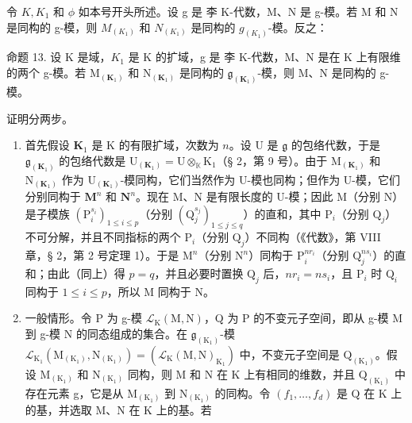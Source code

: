 令 \(K, K_{1}\) 和 \(\phi\) 如本号开头所述。设 g 是 李 K-代数，M、N 是 g-模。若 M 和 N 是同构的 g-模，则 \(M_{(K_{1})}\) 和 \(N_{(K_{1})}\) 是同构的 \(g_{(K_{1})}\)-模。反之：

命题 13. 设 K 是域，\(K_{1}\) 是 K 的扩域，g 是 李 K-代数，M、N 是在 K 上有限维的两个 g-模。若 \(\mathrm{M}_{(\mathbf{K}_{1})}\) 和 \(\mathrm{N}_{(\mathbf{K}_{1})}\) 是同构的 \(\mathfrak{g}_{(\mathbf{K}_{1})}\)-模，则 M、N 是同构的 g-模。

证明分两步。

\begin{enumerate}
\def\labelenumi{(\arabic{enumi})}
\item
  首先假设 \(\mathbf{K}_1\) 是 K 的有限扩域，次数为 \(n\)。设 U 是 \(\mathfrak{g}\) 的包络代数，于是 \(\mathfrak{g}_{(\mathbf{K}_1)}\) 的包络代数是 \(\mathrm{U}_{(\mathbf{K}_1)} = \mathrm{U} \otimes_{\mathbb{K}} \mathrm{K}_1\)（§ 2，第 9 号）。由于 \(\mathrm{M}_{(\mathbf{K}_1)}\) 和 \(\mathrm{N}_{(\mathbf{K}_1)}\) 作为 \(\mathrm{U}_{(\mathbf{K}_1)}\)-模同构，它们当然作为 U-模也同构；但作为 U-模，它们分别同构于 \(\mathbf{M}^n\) 和 \(\mathbf{N}^n\)。现在 M、N 是有限长度的 U-模；因此 M（分别 N）是子模族 \((\mathrm{P}_i^{s_i})_{1 \leqslant i \leqslant p}\)（分别 \((\mathrm{Q}_j^{s_j})_{1 \leqslant j \leqslant q}\)）的直和，其中 \(\mathrm{P}_i\)（分别 \(\mathrm{Q}_j\)）不可分解，并且不同指标的两个 \(\mathrm{P}_i\)（分别 \(\mathrm{Q}_j\)）不同构（《代数》，第 VIII 章，§ 2，第 2 号定理 1）。于是 \(\mathrm{M}^n\)（分别 \(\mathrm{N}^n\)）同构于 \(\mathrm{P}_i^{nr_i}\)（分别 \(\mathrm{Q}_j^{ns_i}\)）的直和；由此（同上）得 \(p = q\)，并且必要时置换 \(\mathrm{Q}_j\) 后，\(nr_i = ns_i\)，且 \(\mathrm{P}_i\) 时 \(\mathrm{Q}_i\) 同构于 \(1 \leqslant i \leqslant p\)，所以 M 同构于 N。
\item
  一般情形。令 P 为 g-模 \(\mathcal{L}_{\mathrm{K}}(\mathrm{M},\mathrm{N})\)，Q 为 P 的不变元子空间，即从 g-模 M 到 g-模 N 的同态组成的集合。在 \(\mathfrak{g}_{(\mathrm{K}_{1})}\)-模 \(\mathcal{L}_{\mathrm{K}_{1}}(\mathrm{M}_{(\mathrm{K}_{1})},\mathrm{N}_{(\mathrm{K}_{1})})=(\mathcal{L}_{\mathrm{K}}(\mathrm{M},\mathrm{N})_{\mathrm{K}_{1}})\) 中，不变元子空间是 \(\mathrm{Q}_{(\mathrm{K}_{1})}\)。假设 \(\mathrm{M}_{(\mathrm{K}_{1})}\) 和 \(\mathrm{N}_{(\mathrm{K}_{1})}\) 同构，则 M 和 N 在 K 上有相同的维数，并且 \(\mathrm{Q}_{(\mathrm{K}_{1})}\) 中存在元素 g，它是从 \(\mathrm{M}_{(\mathrm{K}_{1})}\) 到 \(\mathrm{N}_{(\mathrm{K}_{1})}\) 的同构。令 \((f_{1},\ldots,f_{d})\) 是 Q 在 K 上的基，并选取 M、N 在 K 上的基。若
\end{enumerate}

